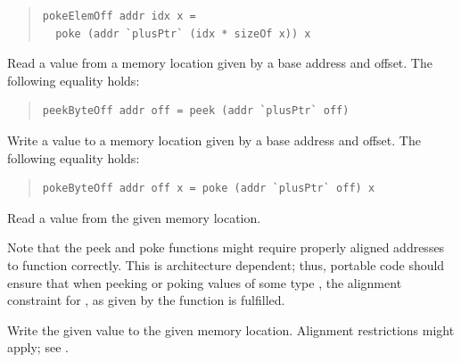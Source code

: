 \begin{haddockdesc}
{\begin{haddockdesc}
{\begin{quote}
{\haddockverb\begin{verbatim}
pokeElemOff addr idx x =
  poke (addr `plusPtr` (idx * sizeOf x)) x\end{verbatim}}
\end{quote}}
\end{haddockdesc}
\begin{haddockdesc}
\item[\begin{tabular}{@{}l}
peekByteOff :: Ptr b -> Int -> IO a
\end{tabular}]
{\haddockbegindoc
Read a value from a memory location given by a base
         address and offset.  The following equality holds:\par
\begin{quote}
{\haddockverb\begin{verbatim}
peekByteOff addr off = peek (addr `plusPtr` off)\end{verbatim}}
\end{quote}}
\end{haddockdesc}
\begin{haddockdesc}
\item[\begin{tabular}{@{}l}
pokeByteOff :: Ptr b -> Int -> a -> IO ()
\end{tabular}]
{\haddockbegindoc
Write a value to a memory location given by a base
         address and offset.  The following equality holds:\par
\begin{quote}
{\haddockverb\begin{verbatim}
pokeByteOff addr off x = poke (addr `plusPtr` off) x\end{verbatim}}
\end{quote}}
\end{haddockdesc}
\begin{haddockdesc}
\item[\begin{tabular}{@{}l}
peek :: Ptr a -> IO a
\end{tabular}]
{\haddockbegindoc
Read a value from the given memory location.\par
Note that the peek and poke functions might require properly
  aligned addresses to function correctly.  This is architecture
  dependent; thus, portable code should ensure that when peeking or
  poking values of some type , the alignment
  constraint for , as given by the function
   is fulfilled.\par}
\end{haddockdesc}
\begin{haddockdesc}
\item[\begin{tabular}{@{}l}
poke :: Ptr a -> a -> IO ()
\end{tabular}]
{\haddockbegindoc
Write the given value to the given memory location.  Alignment
 restrictions might apply; see .\par}
\end{haddockdesc}}
\end{haddockdesc}
